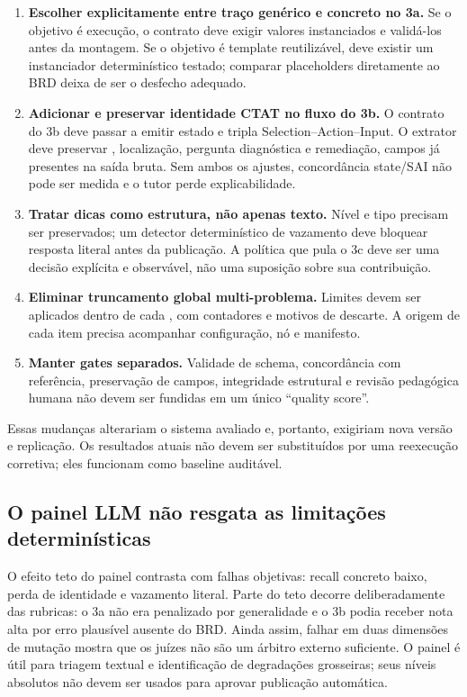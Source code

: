\documentclass[11pt,a4paper]{article}
\begin{document}
\begin{enumerate}
  \item \textbf{Escolher explicitamente entre traço genérico e concreto no 3a.} Se o objetivo é execução, o contrato deve exigir valores instanciados e validá-los antes da montagem. Se o objetivo é template reutilizável, deve existir um instanciador determinístico testado; comparar placeholders diretamente ao BRD deixa de ser o desfecho adequado.
  \item \textbf{Adicionar e preservar identidade CTAT no fluxo do 3b.} O contrato do 3b deve passar a emitir estado e tripla Selection--Action--Input. O extrator deve preservar , localização, pergunta diagnóstica e remediação, campos já presentes na saída bruta. Sem ambos os ajustes, concordância state/SAI não pode ser medida e o tutor perde explicabilidade.
  \item \textbf{Tratar dicas como estrutura, não apenas texto.} Nível e tipo precisam ser preservados; um detector determinístico de vazamento deve bloquear resposta literal antes da publicação. A política que pula o 3c deve ser uma decisão explícita e observável, não uma suposição sobre sua contribuição.
  \item \textbf{Eliminar truncamento global multi-problema.} Limites devem ser aplicados dentro de cada , com contadores e motivos de descarte. A origem de cada item precisa acompanhar configuração, nó e manifesto.
  \item \textbf{Manter gates separados.} Validade de schema, concordância com referência, preservação de campos, integridade estrutural e revisão pedagógica humana não devem ser fundidas em um único ``quality score''.
\end{enumerate}

Essas mudanças alterariam o sistema avaliado e, portanto, exigiriam nova versão e replicação. Os resultados atuais não devem ser substituídos por uma reexecução corretiva; eles funcionam como baseline auditável.

\subsection{O painel LLM não resgata as limitações determinísticas}

O efeito teto do painel contrasta com falhas objetivas: recall concreto baixo, perda de identidade e vazamento literal. Parte do teto decorre deliberadamente das rubricas: o 3a não era penalizado por generalidade e o 3b podia receber nota alta por erro plausível ausente do BRD. Ainda assim, falhar em duas dimensões de mutação mostra que os juízes não são um árbitro externo suficiente. O painel é útil para triagem textual e identificação de degradações grosseiras; seus níveis absolutos não devem ser usados para aprovar publicação automática.
\end{document}
